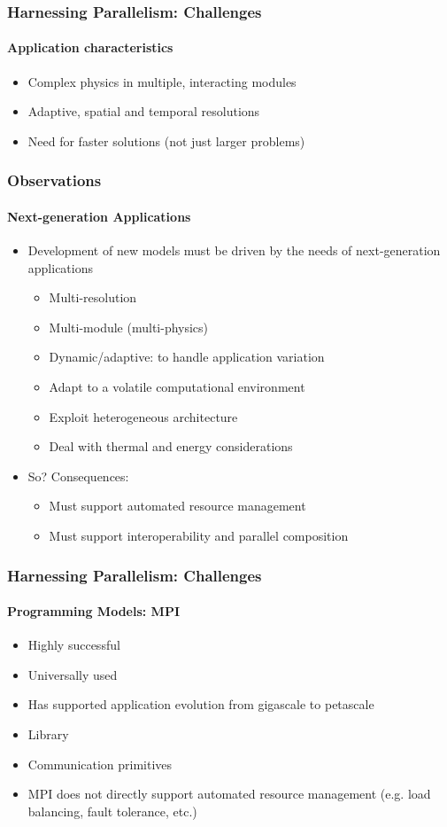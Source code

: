 \begin{frame}[fragile]
\frametitle{Harnessing Parallelism: Challenges}
\framesubtitle{Application characteristics}
  \begin{itemize}
  \item Complex physics in multiple, interacting modules
  \item Adaptive, spatial and temporal resolutions
  \item Need for faster solutions (not just larger problems)
  \end{itemize}
\end{frame}

\begin{frame}[t]
\frametitle{Observations}
\framesubtitle{Next-generation Applications}
  \begin{itemize}
    \item Development of new models must be driven by the needs of next-generation applications
    \begin{itemize}
      \item Multi-resolution
      \item Multi-module (multi-physics)
      \item Dynamic/adaptive: to handle application variation
      \item Adapt to a volatile computational environment
      \item Exploit heterogeneous architecture
      \item Deal with thermal and energy considerations
    \end{itemize}
    \pause
    \item So? Consequences:
    \begin{itemize}
      \item Must support automated resource management
      \item Must support interoperability and parallel composition
    \end{itemize}
  \end{itemize}
\end{frame}

\begin{frame}[t]
\frametitle{Harnessing Parallelism: Challenges}
\framesubtitle{Programming Models: MPI}
  \begin{itemize}
    \item Highly successful
    \item Universally used
    \item Has supported application evolution from gigascale to petascale
  \end{itemize}
  \begin{itemize}
    \item Library
    \item Communication primitives
  \end{itemize}
  \begin{itemize}
    \item MPI does not directly support automated resource management
      (e.g. load balancing, fault tolerance, etc.)
  \end{itemize}
\end{frame}

